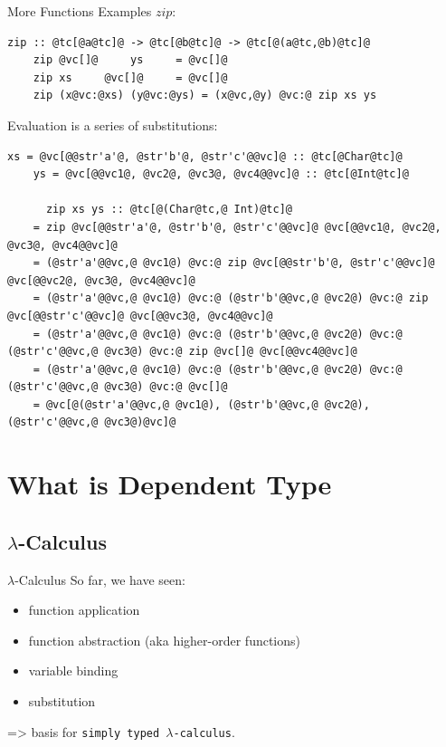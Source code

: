 \documentclass[xcolor={usenames,dvipsnames}]{beamer}
\begin{document}
\begin{frame}[fragile]{More Functions Examples}
  $zip$:
  \begin{lstlisting}[style=hask]
    zip :: @tc[@a@tc]@ -> @tc[@b@tc]@ -> @tc[@(a@tc,@b)@tc]@
    zip @vc[]@     ys     = @vc[]@
    zip xs     @vc[]@     = @vc[]@
    zip (x@vc:@xs) (y@vc:@ys) = (x@vc,@y) @vc:@ zip xs ys
  \end{lstlisting}

  Evaluation is a series of substitutions:
  \begin{lstlisting}[style=hask]
    xs = @vc[@@str'a'@, @str'b'@, @str'c'@@vc]@ :: @tc[@Char@tc]@
    ys = @vc[@@vc1@, @vc2@, @vc3@, @vc4@@vc]@ :: @tc[@Int@tc]@

      zip xs ys :: @tc[@(Char@tc,@ Int)@tc]@
    = zip @vc[@@str'a'@, @str'b'@, @str'c'@@vc]@ @vc[@@vc1@, @vc2@, @vc3@, @vc4@@vc]@
    = (@str'a'@@vc,@ @vc1@) @vc:@ zip @vc[@@str'b'@, @str'c'@@vc]@ @vc[@@vc2@, @vc3@, @vc4@@vc]@
    = (@str'a'@@vc,@ @vc1@) @vc:@ (@str'b'@@vc,@ @vc2@) @vc:@ zip @vc[@@str'c'@@vc]@ @vc[@@vc3@, @vc4@@vc]@
    = (@str'a'@@vc,@ @vc1@) @vc:@ (@str'b'@@vc,@ @vc2@) @vc:@ (@str'c'@@vc,@ @vc3@) @vc:@ zip @vc[]@ @vc[@@vc4@@vc]@
    = (@str'a'@@vc,@ @vc1@) @vc:@ (@str'b'@@vc,@ @vc2@) @vc:@ (@str'c'@@vc,@ @vc3@) @vc:@ @vc[]@
    = @vc[@(@str'a'@@vc,@ @vc1@), (@str'b'@@vc,@ @vc2@), (@str'c'@@vc,@ @vc3@)@vc]@
  \end{lstlisting}
\end{frame}


\section{What is Dependent Type}

\subsection{$\lambda$-Calculus}

\begin{frame}[fragile]{$\lambda$-Calculus}
  So far, we have seen:
  \pause
  \begin{itemize}
    \item function application
    \pause
    \item function abstraction {\tiny(aka higher-order functions)}
    \pause
    \item variable binding
    \pause
    \item substitution
  \end{itemize}
  \pause
  => basis for \texttt{simply typed $\lambda$-calculus}.
\end{frame}
\end{document}
